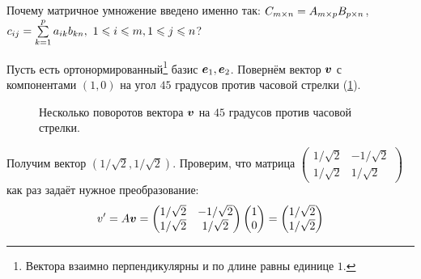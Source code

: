 \documentclass[a4paper,12pt]{article}
\begin{document}
  \begin{remark}
    Почему матричное умножение введено именно так: $C_{m\times n} \hm= A_{m\times p}B_{p\times n}$, $c_{ij} \hm= \sum\limits_{k=1}^p a_{ik} b_{kn},\ 1 \hm\leq i \hm\leq m, 1 \hm\leq j \hm\leq n$?
    
    Пусть есть ортонормированный\footnote{Вектора взаимно перпендикулярны и по длине равны единице $1$.} базис $\boldsymbol e_1, \boldsymbol e_2$.
    Повернём вектор $\boldsymbol v$ с компонентами $(1, 0)$ на угол $45$ градусов против часовой стрелки (\ref{fig:turning-vector}).
    
    \begin{figure}[h]
      \centering
      
      
      \caption{Несколько поворотов вектора $\boldsymbol v$ на $45$ градусов против часовой стрелки.}
      \label{fig:turning-vector}
    \end{figure}
    
    Получим вектор $\left(1/\sqrt{2}, 1/\sqrt{2}\right)$.
    Проверим, что матрица $\left(\begin{smallmatrix}1/\sqrt{2} & -1/\sqrt{2}\\ 1/\sqrt{2} & 1/\sqrt{2}\end{smallmatrix}\right)$ как раз задаёт нужное преобразование:
    \[
      v'
      = A \boldsymbol v
      = \begin{pmatrix}
          1/\sqrt{2} & -1/\sqrt{2}\\
          1/\sqrt{2} & 1/\sqrt{2}
        \end{pmatrix}
        \begin{pmatrix}
          1 \\ 0
        \end{pmatrix}
      = \begin{pmatrix}
          1/\sqrt{2} \\ 1/\sqrt{2}
        \end{pmatrix}
    \]
    

\end{remark}
\end{document}
